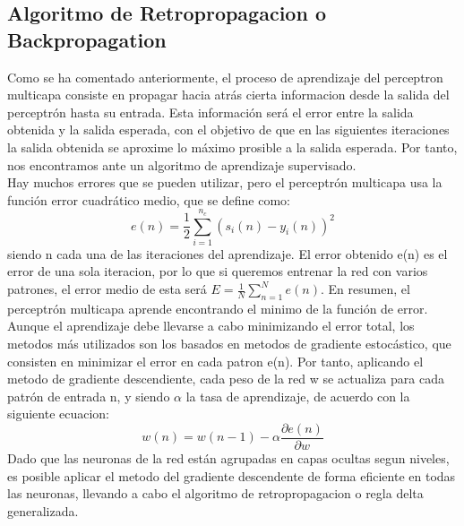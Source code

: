 \subsection{Algoritmo de Retropropagacion o Backpropagation}
Como se ha comentado anteriormente, el proceso de aprendizaje del perceptron multicapa consiste en propagar hacia atrás cierta informacion desde la salida del perceptrón hasta su entrada. Esta información será el error entre la salida obtenida y la salida esperada, con el objetivo de que en las siguientes iteraciones la salida obtenida se aproxime lo máximo prosible a la salida esperada. Por tanto, nos encontramos ante un algoritmo de aprendizaje supervisado.\\
Hay muchos errores que se pueden utilizar, pero el perceptrón multicapa usa la función error cuadrático medio, que se define como:
\begin{equation}
e(n) = \frac{1}{2}\sum_{i=1}^{n_{c}}(s_{i}(n)-y_{i}(n))^{2}
\end{equation}
siendo n cada una de las iteraciones del aprendizaje. El error obtenido e(n) es el error de una sola iteracion, por lo que si queremos entrenar la red con varios patrones, el error medio de esta será ${E=\frac{1}{N}\sum_{n=1}^{N}e(n)}$. En resumen, el perceptrón multicapa aprende encontrando el minimo de la función de error.\\
Aunque el aprendizaje debe llevarse a cabo minimizando el error total, los metodos más utilizados son los basados en metodos de gradiente estocástico, que consisten en minimizar el error en cada patron e(n). Por tanto, aplicando el metodo de gradiente descendiente, cada peso de la red w se actualiza para cada patrón de entrada n, y siendo ${\alpha}$ la tasa de aprendizaje, de acuerdo con la siguiente ecuacion:
\begin{equation}
w(n)=w(n-1)-\alpha \frac{\partial e(n)}{\partial w}
\end{equation}
Dado que las neuronas de la red están agrupadas en capas ocultas segun niveles, es posible aplicar el metodo del gradiente descendente de forma eficiente en todas las neuronas, llevando a cabo el algoritmo de retropropagacion o regla delta generalizada.

